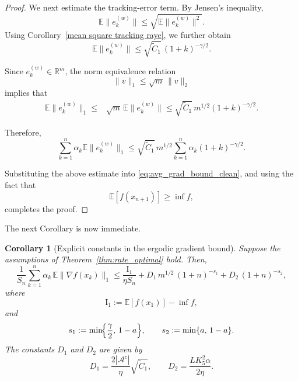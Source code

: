 \documentclass{article}
\newtheorem{corollary}[theorem]{Corollary}
\begin{document}
\begin{proof}
We next estimate the tracking-error term. By Jensen's inequality,
\[
\mathbb{E}\|e_k^{(w)}\|
\le
\sqrt{\mathbb{E}\|e_k^{(w)}\|^2}.
\]
Using Corollary~\ref{mean square tracking raye}, we further obtain
\[
\mathbb{E}\|e_k^{(w)}\|
\le
\sqrt{\widetilde C_1}\,(1+k)^{-\gamma/2}.
\]

Since $e_k^{(w)} \in \mathbb{R}^m$, the norm equivalence relation
\[
\|v\|_1 \le \sqrt{m}\,\|v\|_2
\]
implies that
\[
\begin{aligned}
\mathbb{E}\|e_k^{(w)}\|_1
\le{}&
\sqrt{m}\,\mathbb{E}\|e_k^{(w)}\|
\le{}
\sqrt{\widetilde C_1}\,m^{1/2}(1+k)^{-\gamma/2}.
\end{aligned}
\]

Therefore,
\[
\sum_{k=1}^n
\alpha_k \mathbb{E}\|e_k^{(w)}\|_1
\le
\sqrt{\widetilde C_1}\,m^{1/2}
\sum_{k=1}^n
\alpha_k(1+k)^{-\gamma/2}.
\]

Substituting the above estimate into \eqref{eq:avg_grad_bound_clean}, and using the fact that
\[
\mathbb{E}[f(x_{n+1})] \ge \inf f,
\]
completes the proof.
\end{proof}

The next Corollary is now immediate. 

\begin{corollary}[Explicit constants in the ergodic gradient bound]
\label{cor:ergodic_constants}
Suppose the assumptions of Theorem~\ref{thm:rate_optimal} hold. Then,
\[
\frac{1}{S_n}\sum_{k=1}^n \alpha_k\,\mathbb{E}\bigl\|\nabla f(x_k)\bigr\|_1
\le
\frac{\mathrm{I}_1}{\eta S_n}
+
D_1\, m^{1/2}\,(1+n)^{-s_1}
+
D_2\,(1+n)^{-s_2},
\]
where
\[
\mathrm{I}_1 := \mathbb{E}[f(x_1)]-\inf f,
\]
and
\[
s_1
:=
\min\!\Bigl\{
\frac{\gamma}{2},
\,1-a
\Bigr\},
\qquad
s_2
:=
\min\{a,\,1-a\}.
\]
The constants $D_1$ and $D_2$ are given by
\[
D_1
=
\frac{2|\mathcal{A}^c|}{\eta}\sqrt{\widetilde C_1},
\qquad
D_2
=
\frac{L K_5^2 \alpha}{2\eta}.
\]
\end{corollary}
\end{document}
